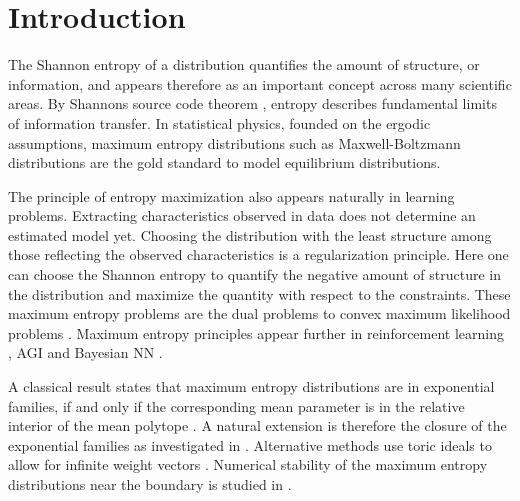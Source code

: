\section{Introduction}

The Shannon entropy of a distribution quantifies the amount of structure, or information, and appears therefore as an important concept across many scientific areas.
By Shannons source code theorem \cite{shannon_mathematical_1948}, entropy describes fundamental limits of information transfer.
In statistical physics, founded on the ergodic assumptions, maximum entropy distributions such as Maxwell-Boltzmann distributions are the gold standard to model equilibrium distributions.

The principle of entropy maximization also appears naturally in learning problems.
Extracting characteristics observed in data does not determine an estimated model yet.
Choosing the distribution with the least structure among those reflecting the observed characteristics is a regularization principle.
Here one can choose the Shannon entropy to quantify the negative amount of structure in the distribution and maximize the quantity with respect to the constraints.
These maximum entropy problems are the dual problems to convex maximum likelihood problems \cite{koller_probabilistic_2009}.
Maximum entropy principles appear further in reinforcement learning \cite{yoon_maximum_2024,song_survey_2025}, AGI \cite{miotto_new_2025} and Bayesian NN \cite{rathnakumar_bayesian_2026}. %

A classical result states that maximum entropy distributions are in exponential families, if and only if the corresponding mean parameter is in the relative interior of the mean polytope \cite{barndorff-nielsen_information_1978}.
A natural extension is therefore the closure of the exponential families as investigated in \cite{csiszar_closures_2005,malago_note_2010}.
Alternative methods use toric ideals to allow for infinite weight vectors \cite{sottile_toric_2008}.
Numerical stability of the maximum entropy distributions near the boundary is studied in \cite{straszak_computing_2017,straszak_maximum_2019}.

